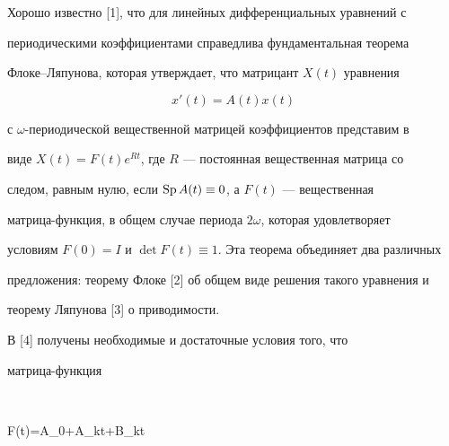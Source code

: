  


\date{} 




\pagestyle{plain} %


 




\maketitle 


\label{begin} 


 


 


 


 


Хорошо известно [1], что для линейных дифференциальных уравнений с 


периодическими коэффициентами справедлива фундаментальная теорема 


Флоке--Ляпунова, которая утверждает, что матрицант $X(t)$ уравнения 


$$ 


x'(t)=A(t)x(t) 


$$ 


с $\omega$-периодической вещественной матрицей коэффициентов представим в 


виде $X(t)=F(t)e^{Rt}$, где $R$ --- постоянная вещественная матрица со 


следом, равным нулю, если $\operatorname{Sp} A(t)\equiv0$, а $F(t)$ --- вещественная 


матрица-функция, в общем случае периода $2\omega$, которая удовлетворяет 


условиям $F(0)=I$ и $\det F(t)\equiv1$. Эта теорема объединяет два различных 


предложения: теорему Флоке [2] об общем виде решения такого уравнения и 


теорему Ляпунова [3] о приводимости. 


 


В [4] получены необходимые и достаточные условия того, что 


матрица-функция 


$$ 


F(t)=A_0+A_k\cos{}t+B_k\sin{}t 



